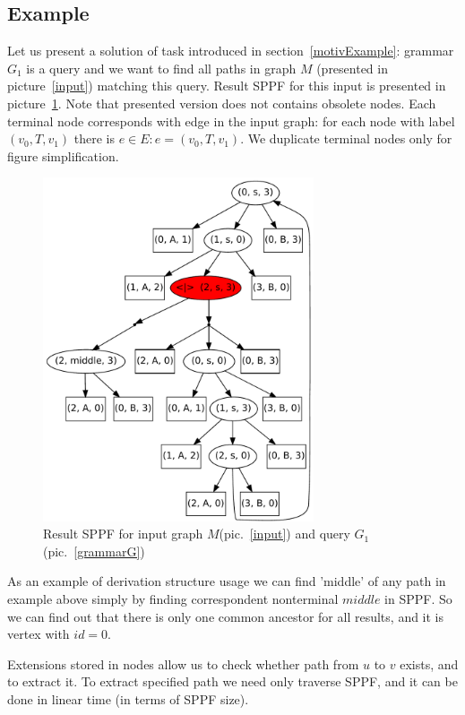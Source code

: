 \subsection{Example}

Let us present a solution of task introduced in section~\ref{motivExample}: grammar $G_1$ is a query and we want to find all paths in graph $M$ (presented in picture~\ref{input}) matching this query.
Result SPPF for this input is presented in picture~\ref{SPPF}. Note that presented version does not contains obsolete nodes.
Each terminal node corresponds with edge in the input graph: for each node with label $(v_0, T, v_1)$ there is $e\in E: e=(v_0,T,v_1)$.
We duplicate terminal nodes only for figure simplification.

\begin{figure}[h]
    \begin{center}
        \includegraphics[width=8cm]{dot/AnBn.pdf}
        \caption{Result SPPF for input graph $M$(pic.~\ref{input}) and query $G_1$(pic.~\ref{grammarG})}
        \label{SPPF}        
    \end{center}
\end{figure}

    
As an example of derivation structure usage we can find 'middle' of any path in example above simply by finding correspondent nonterminal $middle$ in SPPF.
So we can find out that there is only one common ancestor for all results, and it is vertex with $id = 0$. 

Extensions stored in nodes allow us to check whether path from $u$ to $v$ exists, and to extract it. 
To extract specified path we need only traverse SPPF, and it can be done in linear time (in terms of SPPF size). 

